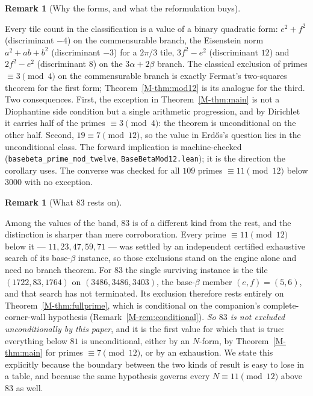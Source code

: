 \documentclass[11pt,reqno]{amsart}
\theoremstyle{plain}
\theoremstyle{definition}
\newtheorem{remark}[theorem]{Remark}
\begin{document}
\begin{remark}[Why the forms, and what the reformulation buys]\label{OM-forms}

Every tile count in the classification is a value of a binary quadratic form: $e^2+f^2$
(discriminant $-4$) on the commensurable branch, the Eisenstein norm $a^2+ab+b^2$ (discriminant
$-3$) for a $2\pi/3$ tile, $3f^2-e^2$ (discriminant $12$) and $2f^2-e^2$ (discriminant $8$) on the
$3\alpha+2\beta$ branch. The classical exclusion of primes $\equiv3\pmod4$ on the commensurable
branch is exactly Fermat's two-squares theorem for the first form; Theorem~\ref{M-thm:mod12} is its
analogue for the third. Two consequences. First, the exception in Theorem~\ref{M-thm:main} is not a
Diophantine side condition but a single arithmetic progression, and by Dirichlet it carries half of
the primes $\equiv3\pmod4$: the theorem is unconditional on the other half. Second,
$19\equiv7\pmod{12}$, so the value in Erd\H os's question lies in the unconditional class.
The forward implication is machine-checked (\texttt{basebeta\_prime\_mod\_twelve},
\texttt{BaseBetaMod12.lean}); it is the direction the corollary uses. The converse was checked for
all $109$ primes $\equiv11\pmod{12}$ below $3000$ with no exception.
\end{remark}

\begin{remark}[What $83$ rests on]\label{OM-eightythree}

Among the values of the band, $83$ is of a different kind from the rest, and the distinction is
sharper than mere corroboration. Every prime $\equiv11\pmod{12}$ below it --- $11,23,47,59,71$ ---
was settled by an independent certified exhaustive search of its base-$\beta$ instance, so those
exclusions stand on the engine alone and need no branch theorem. For $83$ the single surviving
instance is the tile $(1722,83,1764)$ on $(3486,3486,3403)$, the base-$\beta$ member $(e,f)=(5,6)$,
and that search has not terminated. Its exclusion therefore rests entirely on
Theorem~\ref{M-thm:fullprime}, which is conditional on the companion's complete-corner-wall
hypothesis (Remark~\ref{M-rem:conditional}). \emph{So $83$ is not excluded unconditionally by this
paper}, and it is the first value for which that is true: everything below $81$ is unconditional,
either by an $N$-form, by Theorem~\ref{M-thm:main} for primes $\equiv7\pmod{12}$, or by an exhaustion.
We state this explicitly because the boundary between the two kinds of result is easy to lose in a
table, and because the same hypothesis governs every $N\equiv11\pmod{12}$ above $83$ as well.
\end{remark}
\end{document}
